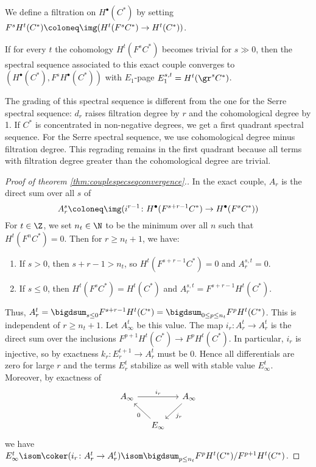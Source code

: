 \documentclass[wip, topology]{bsteffan-lecturenotes}
\begin{document}
We define a filtration on $H^\bullet(C^*)$ by setting $F^s H^t(C^*) \coloneq \img(H^t(F^s C^*) \to H^t(C^*))$.
\begin{theorem}\label{thm:couplespecseqconvergence}
	If for every $t$ the cohomology $H^t(F^s C^*)$ becomes trivial for $s \gg 0$, then the spectral sequence associated to this exact couple converges to $(H^\bullet(C^*), F^s H^\bullet(C^*))$ with $E_1$-page $E_1^{s, t} = H^t(\gr^s C^*)$.
\end{theorem}
\begin{remark}
	The grading of this spectral sequence is different from the one for the Serre spectral sequence: $d_r$ raises filtration degree by $r$ and the cohomological degree by 1.
	If $C^*$ is concentrated in non-negative degrees, we get a first quadrant spectral sequence.
	For the Serre spectral sequence, we use cohomological degree minus filtration degree.
	This regrading remains in the first quadrant because all terms with filtration degree greater than the cohomological degree are trivial.
\end{remark}
\begin{proof}[Proof of theorem \ref{thm:couplespecseqconvergence}.]
	In the exact couple, $A_r$ is the direct sum over all $s$ of
	\begin{equation*}
		A_r^s \coloneq \img(i^{r - 1}\colon H^\bullet(F^{s + r - 1} C^*) \to H^\bullet(F^s C^*))
	\end{equation*}
	For $t \in \Z$, we set $n_t \in \N$ to be the minimum over all $n$ such that $H^t(F^n C^*) = 0$.
	Then for $r \geq n_t + 1$, we have:
	\begin{enumerate}
		\item If $s > 0$, then $s + r - 1 > n_t$, so $H^t(F^{s + r - 1} C^*) = 0$ and $A_r^{s, t} = 0$. %
		\item If $s \leq 0$, then $H^t(F^s C^*) = H^t(C^*)$ and $A_r^{s, t} = F^{s + r - 1} H^t(C^*)$.
	\end{enumerate}
	Thus, $A_r^t = \bigdsum_{s \leq 0} F^{s + r - 1} H^t(C^*) = \bigdsum_{0 \leq p \leq n_t} F^p H^t(C^*)$.
	This is independent of $r \geq n_t + 1$.
	Let $A_\infty^t$ be this value.
	The map $i_r\colon A_r^t \to A_r^t$ is the direct sum over the inclusions $F^{p + 1} H^t(C^*) \to F^p H^t(C^*)$.
	In particular, $i_r$ is injective, so by exactness $k_r\colon E_r^{t + 1} \to A_r^t$ must be 0.
	Hence all differentials are zero for large $r$ and the terms $E_r^t$ stabilize as well with stable value $E_\infty^t$.
	Moreover, by exactness of
	\begin{equation*}
		\begin{tikzcd}[column sep = small]
			A_\infty
					\ar[rr, "i_r"]
				& & A_\infty
					\ar[dl, "j_r"]
			\\
				& E_\infty
					\ar[ul, "0"]
		\end{tikzcd}
	\end{equation*}
	we have $E_\infty^t \isom \coker(i_r\colon A_r^t \to A_r^t) \isom \bigdsum_{p \leq n_t} F^p H^t(C^*) / F^{p + 1} H^t(C^*)$.
\end{proof}
\end{document}
